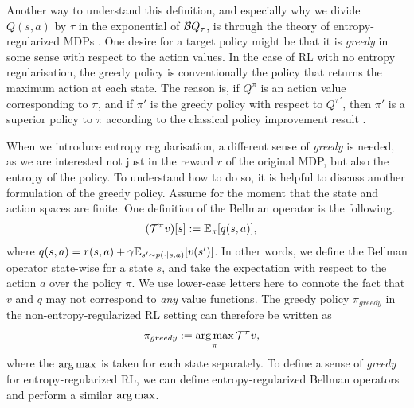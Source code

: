 \documentclass[\main/thesis.tex]{subfiles}
\begin{document}
Another way to understand this definition, and especially why we divide $Q(s, a)$ by $\tau$ in the exponential of $\mathcal{B}Q_\tau$, is through the theory of entropy-regularized MDPs \citep{geist2019theory}. One desire for a target policy might be that it is \textit{greedy} in some sense with respect to the action values. In the case of RL with no entropy regularisation, the greedy policy is conventionally the policy that returns the maximum action at each state. The reason is, if $Q^\pi$ is an action value corresponding to $\pi$, and if $\pi'$ is the greedy policy with respect to $Q^{\pi'}$, then $\pi'$ is a superior policy to $\pi$ according to the classical policy improvement result \citep{sutton2018reinforcement}. 

When we introduce entropy regularisation, a different sense of \textit{greedy} is needed, as we are interested not just in the reward $r$ of the original MDP, but also the entropy of the policy. To understand how to do so, it is helpful to discuss another formulation of the greedy policy. Assume for the moment that the state and action spaces are finite. One definition of the Bellman operator is the following.
\begin{align}\label{eq:bellman-op}
    (\mathcal{T}^\pi v)[s] &:= \mathbb{E}_\pi[q(s, a)],
\end{align}
where $q(s, a) = r(s, a) + \gamma \mathbb{E}_{s' \sim p(\cdot \mid s, a)}[v(s')]$. In other words, we define the Bellman operator state-wise for a state $s$, and take the expectation with respect to the action $a$ over the policy $\pi$. We use lower-case letters here to connote the fact that $v$ and $q$ may not correspond to \textit{any} value functions. The greedy policy $\pi_{greedy}$ in the non-entropy-regularized RL setting can therefore be written as
\begin{align*}
    \pi_{greedy} &:= \operatorname*{arg\,max}_\pi \mathcal{T}^\pi v,
\end{align*}
where the $\operatorname*{arg\,max}$ is taken for each state separately. To define a sense of \textit{greedy} for entropy-regularized RL, we can define entropy-regularized Bellman operators and perform a similar $\operatorname*{arg\,max}$. 
\end{document}

